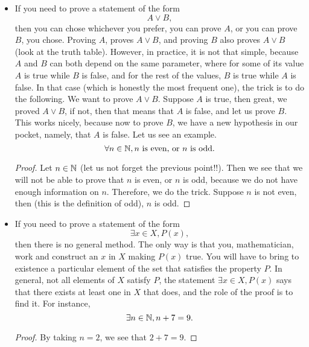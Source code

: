 \begin{itemize}
    \item If you need to prove a statement of the form
        \begin{equation*}
            A \lor B,
        \end{equation*}
        then you can chose whichever you prefer, you can prove \( A \), or you can prove \( B \), you chose. Proving \( A \), proves \( A \lor B \), and proving \( B \) also proves \( A \lor B \) (look at the truth table). However, in practice, it is not that simple, because \( A \) and \( B \) can both depend on the same parameter, where for some of its value \( A \) is true while \( B \) is false, and for the rest of the values, \( B \) is true while \( A \) is false. In that case (which is honestly the most frequent one), the trick is to do the following. We want to prove \( A \lor B \). Suppose \( A \) is true, then great, we proved \( A \lor B \), if not, then that means that \( A \) is false, and let us prove \( B \). This works nicely, because now to prove \( B \), we have a new hypothesis in our pocket, namely, that \( A \) is false. Let us see an example.
        \begin{equation*}
            \forall n \in \mathbb{N}, n \text{ is even, or } n \text{ is odd}.
        \end{equation*}
        \begin{proof}
            Let \( n \in \mathbb{N} \) (let us not forget the previous point!!). Then we see that we will not be able to prove that \( n \) is even, or \( n \) is odd, because we do not have enough information on \( n \). Therefore, we do the trick. Suppose \( n \) is not even, then (this is the definition of odd), \( n \) is odd.
        \end{proof}
        
    \item If you need to prove a statement of the form
        \begin{equation*}
            \exists x \in X, P(x),
        \end{equation*}
        then there is no general method. The only way is that you, mathematician, work and construct an \( x \) in \( X \) making \( P(x) \) true. You will have to bring to existence a particular element of the set that satisfies the property \( P \). In general, not all elements of \( X \) satisfy \( P \), the statement \( \exists x \in X, P(x) \) says that there exists at least one in \( X \) that does, and the role of the proof is to find it. For instance,
        \begin{equation*}
            \exists n \in \mathbb{N}, n + 7 = 9.
        \end{equation*}
        \begin{proof}
            By taking \( n = 2 \), we see that \( 2 + 7 = 9 \).
        \end{proof}


\end{itemize}
